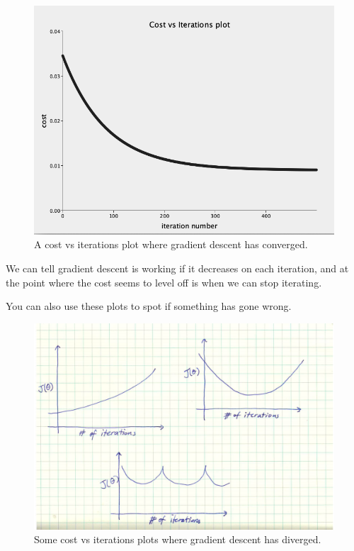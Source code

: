 \documentclass[11pt]{article}
\begin{document}
    \begin{figure}
        \includegraphics[width=\textwidth]{cost-iterations}
        \caption{A cost vs iterations plot where gradient descent has converged.}
        \label{fig:converged}
    \end{figure}

    We can tell gradient descent is working if it decreases on each iteration, and at the point where the cost seems to level off is when we can stop iterating.

    You can also use these plots to spot if something has gone wrong.

    \begin{figure}
        \includegraphics[width=\textwidth]{gd-diverged}
        \caption{Some cost vs iterations plots where gradient descent has diverged.}
        \label{fig:diverged}
    \end{figure}
\end{document}
